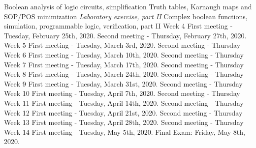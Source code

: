 \documentclass[10pt]{article}
\begin{document}
\begin{outline}[enumerate]
\3 Boolean analysis of logic circuits, simplification
\3 Truth tables, Karnaugh maps and SOP/POS minimization
\3 \textit{Laboratory exercise, part II}
\4 Complex boolean functions, simulation, programmable logic, verification, part II
\1 Week 4
\2 First meeting - Tuesday, February 25th, 2020.
\2 Second meeting - Thursday, February 27th, 2020.
\1 Week 5
\2 First meeting - Tuesday, March 3rd, 2020.
\2 Second meeting - Thursday
\1 Week 6
\2 First meeting - Tuesday, March 10th, 2020.
\2 Second meeting - Thursday
\1 Week 7
\2 First meeting - Tuesday, March 17th, 2020.
\2 Second meeting - Thursday
\1 Week 8
\2 First meeting - Tuesday, March 24th, 2020.
\2 Second meeting - Thursday
\1 Week 9
\2 First meeting - Tuesday, March 31st, 2020.
\2 Second meeting - Thursday
\1 Week 10
\2 First meeting - Tuesday, April 7th, 2020.
\2 Second meeting - Thursday
\1 Week 11
\2 First meeting - Tuesday, April 14th, 2020.
\2 Second meeting - Thursday
\1 Week 12
\2 First meeting - Tuesday, April 21st, 2020.
\2 Second meeting - Thursday
\1 Week 13
\2 First meeting - Tuesday, April 28th, 2020.
\2 Second meeting - Thursday
\1 Week 14
\2 First meeting - Tuesday, May 5th, 2020.
\1 Final Exam: Friday, May 8th, 2020.
\end{outline}
\end{document}
